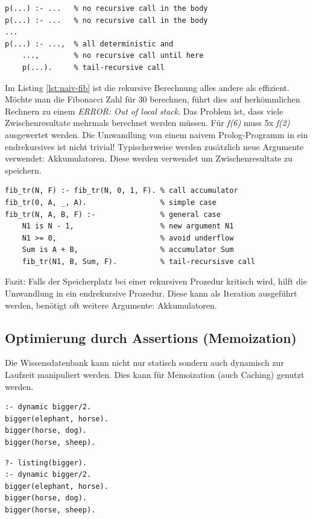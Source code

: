 \begin{lstlisting}[caption=Endrekursion: Allg. Beispiel]
p(...) :- ... 	% no recursive call in the body
p(...) :- ... 	% no recursive call in the body
...
p(...) :- ..., 	% all deterministic and
	..., 		% no recursive call until here
	p(...). 	% tail-recursive call
\end{lstlisting}

Im Listing \ref{lst:naiv-fib} ist die rekursive Berechnung alles andere als effizient. Möchte man die Fibonacci Zahl für 30 berechnen, führt dies auf herkömmlichen Rechnern zu einem \emph{ERROR: Out of local stack}. Das Problem ist, dass viele Zwischenresultate mehrmals berechnet werden müssen. Für \emph{f(6)} muss 5x \emph{f(2)} ausgewertet werden. Die Umwandlung von einem naivem Prolog-Programm in ein endrekursives ist nicht trivial! Typischerweise werden zusätzlich neue Argumente verwendet: Akkumulatoren. Diese werden verwendet um Zwischenresultate zu speichern.

\begin{lstlisting}[caption=Endrekursive Fibonnaci-Berechnung]
fib_tr(N, F) :- fib_tr(N, 0, 1, F). % call accumulator
fib_tr(0, A, _, A). 				% simple case
fib_tr(N, A, B, F) :- 				% general case
	N1 is N - 1, 					% new argument N1
	N1 >= 0, 						% avoid underflow
	Sum is A + B,					% accumulator Sum
	fib_tr(N1, B, Sum, F). 			% tail-recursisve call
\end{lstlisting}

Fazit: Falls der Speicherplatz bei einer rekursiven Prozedur kritisch wird, hilft die Umwandlung in ein endrekursive Prozedur. Diese kann als Iteration ausgeführt werden, benötigt oft weitere Argumente: Akkumulatoren.

\newpage
\subsection{Optimierung durch Assertions (Memoization)}
Die Wissensdatenbank kann nicht nur statisch sondern auch dynamisch zur Laufzeit manipuliert werden. Dies kann für Memoization (auch Caching) genutzt werden.

\begin{lstlisting}[caption=dynamic/1]
% Damit Prädikate zur Laufzeit modifiziert werden können, müssen diese mit dynamic definiert werden.
:- dynamic bigger/2.
bigger(elephant, horse).
bigger(horse, dog).
bigger(horse, sheep).
\end{lstlisting}

\begin{lstlisting}[caption=listing/1]
% Mittels listing können die Fakten und Regel zu einem Prädikat angezeigt werden.
?- listing(bigger).
:- dynamic bigger/2.
bigger(elephant, horse).
bigger(horse, dog).
bigger(horse, sheep).
\end{lstlisting}

